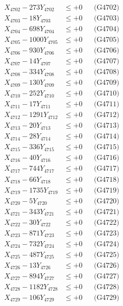 \documentclass[a4paper,10pt]{article}
\begin{document}
{\begin{align}
X_{4702} - 273Y_{4702} &\leq +0 && \text{(G4702)} \\
X_{4703} - 18Y_{4703} &\leq +0 && \text{(G4703)} \\
X_{4704} - 698Y_{4704} &\leq +0 && \text{(G4704)} \\
X_{4705} - 1000Y_{4705} &\leq +0 && \text{(G4705)} \\
X_{4706} - 930Y_{4706} &\leq +0 && \text{(G4706)} \\
X_{4707} - 14Y_{4707} &\leq +0 && \text{(G4707)} \\
X_{4708} - 334Y_{4708} &\leq +0 && \text{(G4708)} \\
X_{4709} - 130Y_{4709} &\leq +0 && \text{(G4709)} \\
X_{4710} - 252Y_{4710} &\leq +0 && \text{(G4710)} \\
\allowbreak
X_{4711} - 17Y_{4711} &\leq +0 && \text{(G4711)} \\
X_{4712} - 1291Y_{4712} &\leq +0 && \text{(G4712)} \\
X_{4713} - 20Y_{4713} &\leq +0 && \text{(G4713)} \\
X_{4714} - 28Y_{4714} &\leq +0 && \text{(G4714)} \\
X_{4715} - 336Y_{4715} &\leq +0 && \text{(G4715)} \\
X_{4716} - 40Y_{4716} &\leq +0 && \text{(G4716)} \\
X_{4717} - 744Y_{4717} &\leq +0 && \text{(G4717)} \\
X_{4718} - 66Y_{4718} &\leq +0 && \text{(G4718)} \\
X_{4719} - 1735Y_{4719} &\leq +0 && \text{(G4719)} \\
X_{4720} - 5Y_{4720} &\leq +0 && \text{(G4720)} \\
\allowbreak
X_{4721} - 343Y_{4721} &\leq +0 && \text{(G4721)} \\
X_{4722} - 30Y_{4722} &\leq +0 && \text{(G4722)} \\
X_{4723} - 871Y_{4723} &\leq +0 && \text{(G4723)} \\
X_{4724} - 732Y_{4724} &\leq +0 && \text{(G4724)} \\
X_{4725} - 487Y_{4725} &\leq +0 && \text{(G4725)} \\
X_{4726} - 13Y_{4726} &\leq +0 && \text{(G4726)} \\
X_{4727} - 894Y_{4727} &\leq +0 && \text{(G4727)} \\
X_{4728} - 1182Y_{4728} &\leq +0 && \text{(G4728)} \\
X_{4729} - 106Y_{4729} &\leq +0 && \text{(G4729)} \\

\end{align}}
\end{document}
